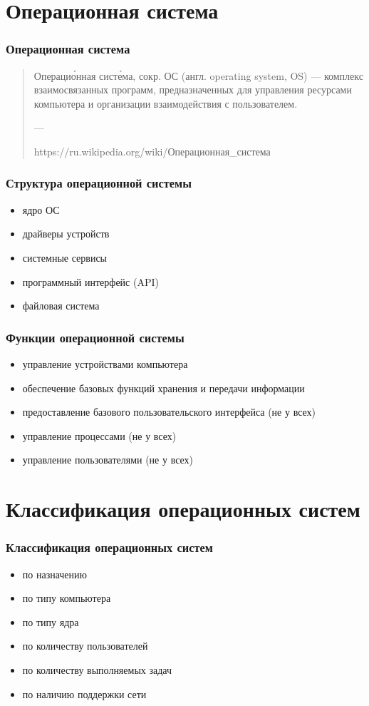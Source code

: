 \documentclass[9pt,pdf]{beamer}
\begin{document}
\section{Операционная система}

\begin{frame}
	\frametitle{Операционная система}
	\begin{quotation}
		Операцио́нная систе́ма, сокр. ОС (англ. operating system, OS) — комплекс взаимосвязанных программ, предназначенных для управления ресурсами компьютера и организации взаимодействия с пользователем.
		
		---
		
		https://ru.wikipedia.org/wiki/Операционная\_система
	\end{quotation}
\end{frame}

\begin{frame}
	\frametitle{Структура операционной системы}
	\begin{itemize}
		\item ядро ОС
		\item драйверы устройств
		\item системные сервисы
		\item программный интерфейс (API)
		\item файловая система
	\end{itemize}
\end{frame}

\begin{frame}
	\frametitle{Функции операционной системы}
	\begin{itemize}
		\item управление устройствами компьютера
		\item обеспечение базовых функций хранения и передачи информации
		\item предоставление базового пользовательского интерфейса (не у всех)
		\item управление процессами (не у всех)
		\item управление пользователями (не у всех)
	\end{itemize}
\end{frame}

\section{Классификация операционных систем}

\begin{frame}
	\frametitle{Классификация операционных систем}
	\begin{itemize}
		\item по назначению
		\item по типу компьютера
		\item по типу ядра
		\item по количеству пользователей
		\item по количеству выполняемых задач
		\item по наличию поддержки сети
	\end{itemize}
\end{frame}
\end{document}
